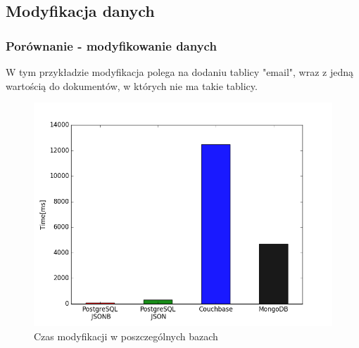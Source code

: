 \documentclass{beamer}
\begin{document}
\begin{frame}[fragile]
\subsection{Modyfikacja danych}
\frametitle{Porównanie - modyfikowanie danych}
W tym przykładzie modyfikacja polega na dodaniu tablicy "email", wraz z jedną wartością do dokumentów, w których nie ma takie tablicy.

\begin{figure}[h]
\begin{center}
\includegraphics[scale=0.37]{ax/fig5}
\end{center}
\caption{Czas modyfikacji w poszczególnych bazach}
\end{figure}

\end{frame}
\end{document}
